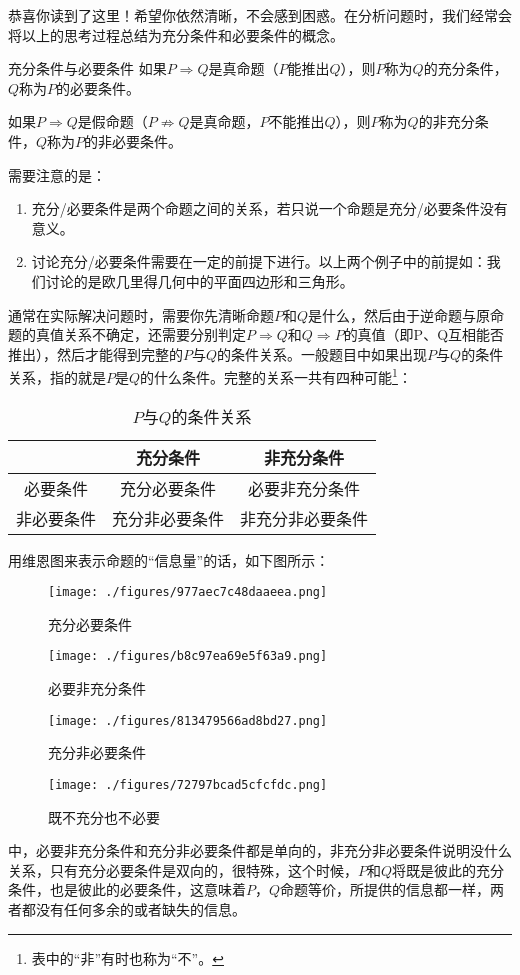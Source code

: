 恭喜你读到了这里！希望你依然清晰，不会感到困惑。在分析问题时，我们经常会将以上的思考过程总结为充分条件和必要条件的概念。

\begin{definition}{充分条件与必要条件}
如果$P\Rightarrow Q$是真命题（$P$能推出$Q$），则$P$称为$Q$的充分条件，$Q$称为$P$的必要条件。

如果$P\Rightarrow Q$是假命题（$P\not\Rightarrow Q$是真命题，$P$不能推出$Q$），则$P$称为$Q$的非充分条件，$Q$称为$P$的非必要条件。
\end{definition}

需要注意的是：
\begin{enumerate}
\item 充分/必要条件是两个命题之间的关系，若只说一个命题是充分/必要条件没有意义。
\item 讨论充分/必要条件需要在一定的前提下进行。以上两个例子中的前提如：我们讨论的是欧几里得几何中的平面四边形和三角形。
\end{enumerate}

通常在实际解决问题时，需要你先清晰命题$P$和$Q$是什么，然后由于逆命题与原命题的真值关系不确定，还需要分别判定$P\Rightarrow Q$和$Q\Rightarrow P$的真值（即P、Q互相能否推出），然后才能得到完整的$P$与$Q$的条件关系。一般题目中如果出现$P$与$Q$的条件关系，指的就是$P$是$Q$的什么条件。完整的关系一共有四种可能\footnote{表中的“非”有时也称为“不”。}：

\begin{table}[ht]
\centering
\caption{$P$与$Q$的条件关系}\label{tab_HsCoPr5}
\begin{tabular}{|c|c|c|}
\hline
& 充分条件 & 非充分条件 \\
\hline
必要条件& 充分必要条件 & 必要非充分条件 \\
\hline
非必要条件 & 充分非必要条件 & 非充分非必要条件 \\
\hline
\end{tabular}
\end{table}

用维恩图来表示命题的“信息量”的话，如下图所示：

\begin{figure}[ht]
\centering
\texttt{[image: ./figures/977aec7c48daaeea.png]}
\caption{充分必要条件} \label{fig_HsCoPr_1}
\end{figure}
\begin{figure}[ht]
\centering
\texttt{[image: ./figures/b8c97ea69e5f63a9.png]}
\caption{必要非充分条件} \label{fig_HsCoPr_2}
\end{figure}
\begin{figure}[ht]
\centering
\texttt{[image: ./figures/813479566ad8bd27.png]}
\caption{充分非必要条件} \label{fig_HsCoPr_3}
\end{figure}
\begin{figure}[ht]
\centering
\texttt{[image: ./figures/72797bcad5cfcfdc.png]}
\caption{既不充分也不必要} \label{fig_HsCoPr_4}
\end{figure}
中，必要非充分条件和充分非必要条件都是单向的，非充分非必要条件说明没什么关系，只有充分必要条件是双向的，很特殊，这个时候，$P$和$Q$将既是彼此的充分条件，也是彼此的必要条件，这意味着$P$，$Q$命题等价，所提供的信息都一样，两者都没有任何多余的或者缺失的信息。

